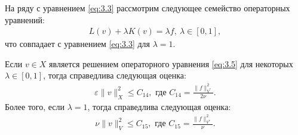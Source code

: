 На ряду с уравнением \ref{eq:3.3} рассмотрим следующее семейство операторных уравнений:
\begin{equation}\label{eq:3.5}
    \begin{gathered}
    L(v)+\lambda K(v)=\lambda f, \ \lambda\in [0,1],
    \end{gathered}
\end{equation}
что совпадает с уравнением \ref{eq:3.3} для $\lambda=1$.

\begin{theorem}\label{tm:3.1}
    Если $v\in X$ является решением операторного уравнения \ref{eq:3.5} для некоторых $\lambda\in [0,1]$, тогда справедлива следующая оценка:
    \begin{equation}\label{eq:3.6}
        \begin{gathered}
            \varepsilon\|v\|^2_X\leqslant C_{14}, \textrm{ где } C_{14}=\frac{\|f\|^2_{V^*}}{2\nu}.
        \end{gathered}
    \end{equation}
    Более того, если $\lambda = 1$, тогда справедлива следующая оценка:
    \begin{equation}\label{eq:3.7}
        \begin{gathered}
            \nu\|v\|^2_V\leqslant C_{15}, \textrm{ где } C_{15}=\frac{\|f\|^2_{V^*}}{\nu}.
        \end{gathered}
    \end{equation}
\end{theorem}

